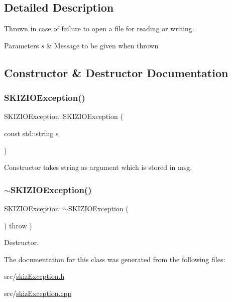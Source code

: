 \subsection{Detailed Description}
Thrown in case of failure to open a file for reading or writing. 


\begin{DoxyParams}{Parameters}
{\em s} & Message to be given when thrown \\
\hline
\end{DoxyParams}


\subsection{Constructor \& Destructor Documentation}
\mbox{\label{classSKIZIOException_a9f25dbc11996a8755965923611cce128}} 
\subsubsection{\texorpdfstring{S\+K\+I\+Z\+I\+O\+Exception()}{SKIZIOException()}}
{\footnotesize\ttfamily S\+K\+I\+Z\+I\+O\+Exception\+::\+S\+K\+I\+Z\+I\+O\+Exception (\begin{DoxyParamCaption}\item[{const std\+::string}]{s }\end{DoxyParamCaption})}



Constructor takes string as argument which is stored in msg. 

\mbox{\label{classSKIZIOException_af331baab993a6666a5f6509a332510b3}} 
\subsubsection{\texorpdfstring{$\sim$\+S\+K\+I\+Z\+I\+O\+Exception()}{~SKIZIOException()}}
{\footnotesize\ttfamily S\+K\+I\+Z\+I\+O\+Exception\+::$\sim$\+S\+K\+I\+Z\+I\+O\+Exception (\begin{DoxyParamCaption}{ }\end{DoxyParamCaption}) throw  ) \hspace{0.3cm}{\ttfamily [virtual]}}



Destructor. 



The documentation for this class was generated from the following files\+:\begin{DoxyCompactItemize}
\item 
src/\mbox{\hyperlink{skizException_8h}{skiz\+Exception.\+h}}\item 
src/\mbox{\hyperlink{skizException_8cpp}{skiz\+Exception.\+cpp}}\end{DoxyCompactItemize}
